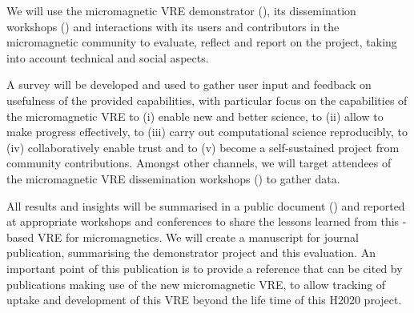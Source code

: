 \begin{workpackage}[id=social-aspects,wphases=0-48,
  title=Social Aspects,
  lead=UO,
  UORM=27,USHRM=8, USORM=6]
\begin{tasklist}
\begin{task}[title=Mechanism Design for free software development,id=decisionmaking]
\end{task}

\begin{task}[title=Evaluation of Micromagnetic VRE,lead=USO,PM=6,
id=oommf-nb-evaluation,partners={UO,PS}]
  We will use the micromagnetic VRE demonstrator
  (), its dissemination
  workshops \linebreak()
  and interactions with its users and contributors in the
  micromagnetic community to evaluate, reflect and report on the project,
  taking into account technical and social aspects.

  A survey will be developed and used to gather user input and
  feedback on usefulness of the provided capabilities, with particular
  focus on the capabilities of the micromagnetic VRE to (i) enable new
  and better science, to (ii) allow to make progress effectively, to
  (iii) carry out computational science reproducibly, to (iv)
  collaboratively enable trust and to (v) become a self-sustained
  project from community contributions. Amongst other channels, we
  will target attendees of the micromagnetic VRE dissemination
  workshops () to
  gather data.

  All results and insights will be summarised in a public document
  () and reported at appropriate
  workshops and conferences to share the lessons learned from this
  \Jupyter-based VRE for micromagnetics. We will create a manuscript
  for journal publication, summarising the demonstrator project and
  this evaluation. An important point of this publication is to
  provide a reference that can be cited by publications making use of
  the new micromagnetic VRE, to allow tracking of uptake and
  development of this VRE beyond the life time of this H2020 project.
\end{task}



\end{tasklist}



\end{workpackage}
